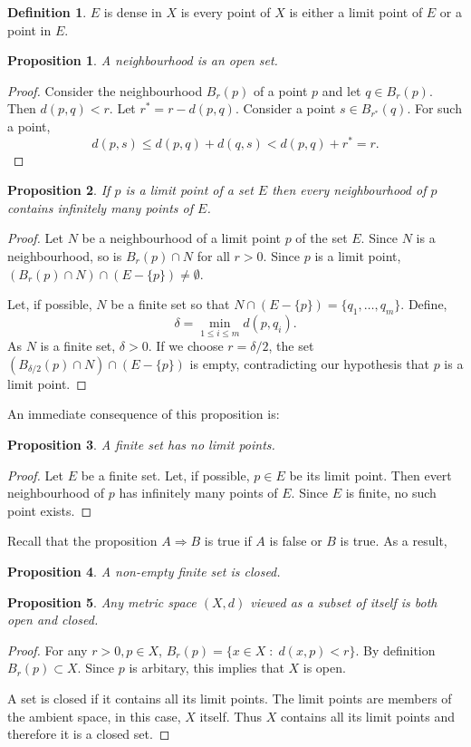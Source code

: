 \documentclass{article}
\theoremstyle{plain}
\numberwithin{thm}{section}
\theoremstyle{plain}
\newtheorem{prop}{Proposition}
\numberwithin{prop}{section}
\theoremstyle{definition}
\newtheorem{defn}{Definition}
\numberwithin{defn}{section}
\theoremstyle{remark}
\numberwithin{equation}{section}
\begin{document}
\begin{defn}\label{s1d14}
$E$ is dense in $X$ is every point of $X$ is either a limit point of $E$ or a
point in $E$.
\end{defn}

\begin{prop}\label{s1p3}
A neighbourhood is an open set.
\end{prop}
\begin{proof}
Consider the neighbourhood $B_r(p)$ of a point $p$ and let $q \in B_r(p)$. Then
$d(p, q) < r$. Let $r^\ast = r - d(p, q)$. Consider a point $s \in 
B_{r^\ast}(q)$. For such a point,
\[
d(p, s) \le d(p, q) + d(q, s) < d(p, q) + r^\ast = r.
\]
\end{proof}

\begin{prop}\label{s1p4}
If $p$ is a limit point of a set $E$ then every neighbourhood of $p$ contains
infinitely many points of $E$.
\end{prop}
\begin{proof}
Let $N$ be a neighbourhood of a limit point $p$ of the set $E$. Since $N$ is a
neighbourhood, so is $B_r(p) \cap N$ for all $r > 0$. Since $p$ is a limit
point, $(B_r(p) \cap N) \cap (E - \{p\}) \ne \emptyset$.

Let, if possible, $N$ be a finite set so that $N \cap (E - \{p\}) = \{q_1, 
\ldots, q_m\}$. Define,
\[
\delta = \min_{1 \le i \le m} d(p, q_i).
\]
As $N$ is a finite set, $\delta > 0$. If we choose $r = \delta/2$, the set 
$(B_{\delta/2}(p) \cap N) \cap (E - \{p\})$ is empty, contradicting our 
hypothesis that $p$ is a limit point.
\end{proof}

An immediate consequence of this proposition is:
\begin{prop}\label{s1p5}
A finite set has no limit points.
\end{prop}
\begin{proof}
Let $E$ be a finite set. Let, if possible, $p \in E$ be its limit point. Then
evert neighbourhood of $p$ has infinitely many points of $E$. Since $E$ is
finite, no such point exists.
\end{proof}

Recall that the proposition $A \Rightarrow B$ is true if $A$ is false or $B$
is true. As a result,
\begin{prop}\label{s1p6}
A non-empty finite set is closed.
\end{prop}

\begin{prop}\label{s1p7}
Any metric space $(X, d)$ viewed as a subset of itself is both open and closed.
\end{prop}
\begin{proof}
For any $r > 0, p \in X$, $B_r(p) = \{x \in X \;:\; d(x, p) < r\}$. By 
definition $B_r(p) \subset X$. Since $p$ is arbitary, this implies that $X$
is open.

A set is closed if it contains all its limit points. The limit points are
members of the ambient space, in this case, $X$ itself. Thus $X$ contains all
its limit points and therefore it is a closed set.
\end{proof}
\end{document}
